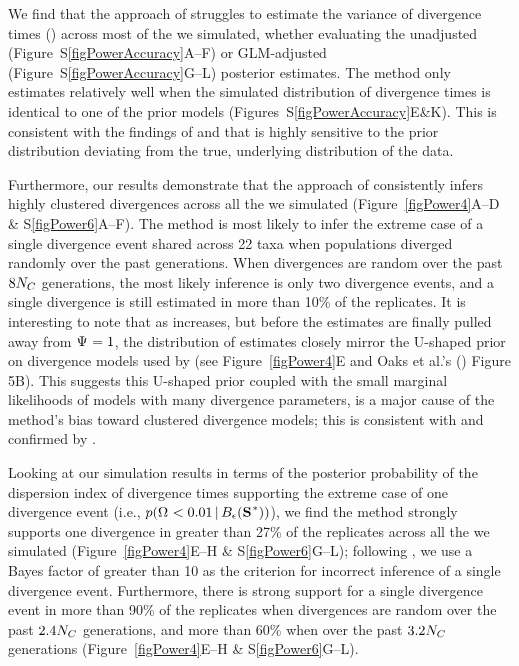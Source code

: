 We find that the approach of \citet{Hickerson2013} struggles to estimate the
variance of divergence times (\vmratio{}) across most of the 
we simulated, whether evaluating the unadjusted
(Figure~S\ref{figPowerAccuracy}A--F) or GLM-adjusted
(Figure~S\ref{figPowerAccuracy}G--L) posterior estimates.
The method only estimates \vmratio{} relatively well when the simulated
distribution of divergence times is identical to one of the prior models
(Figures~S\ref{figPowerAccuracy}E\&K).
This is consistent with the findings of \citet{Oaks2012}  and
\citet{Hickerson2013} that \msb is highly sensitive to the prior distribution
deviating from the true, underlying distribution of the data.

Furthermore, our results demonstrate that the approach of \citet{Hickerson2013}
consistently infers highly clustered divergences across all the  we
simulated (Figure~\ref{figPower4}A--D \& S\ref{figPower6}A--F).
The method is most likely to infer the extreme case of a single divergence
event shared across 22 taxa when populations diverged randomly over the past
\globalcoalunit generations.
When divergences are random over the past $8N_C$ generations, the
most likely inference is only two divergence events, and a single
divergence is still estimated in more than 10\% of the replicates.
It is interesting to note that as  increases, but before the
estimates are finally pulled away from $\Psi_{} = 1$, the distribution of
\numt{} estimates closely mirror the U-shaped prior on divergence models
used by \msb (see Figure~\ref{figPower4}E and Oaks et al.'s
(\citeyear{Oaks2012}) Figure 5B).
This suggests this U-shaped prior coupled with the small marginal likelihoods
of models with many divergence parameters, is a major cause of the method's
bias toward clustered divergence models; this is consistent with
\citet{Oaks2012} and confirmed by \citet{Oaks2014dpp}.

Looking at our simulation results in terms of the posterior probability of the
dispersion index of divergence times supporting the extreme case of one
divergence event (i.e., $p(\vmratio{} < 0.01 \given \ssSpace)$), we find the
method strongly supports one divergence in greater than 27\% of the replicates
across all the  we simulated (Figure~\ref{figPower4}E--H \&
S\ref{figPower6}G--L);
following \citet{Hickerson2013}, we use a Bayes factor of greater than 10 as
the criterion for incorrect inference of a single divergence event.
Furthermore, there is strong support for a single divergence event in
more than 90\% of the replicates when divergences are random over the past
$2.4N_C$ generations, and more than 60\% when over the past
$3.2N_C$ generations (Figure~\ref{figPower4}E--H \&
S\ref{figPower6}G--L).

